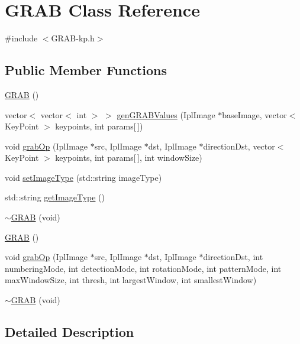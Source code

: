 \hypertarget{class_g_r_a_b}{\section{G\-R\-A\-B Class Reference}
\label{class_g_r_a_b}
}


{\ttfamily \#include $<$G\-R\-A\-B-\/kp.\-h$>$}

\subsection*{Public Member Functions}
\begin{DoxyCompactItemize}
\item 
\hyperlink{class_g_r_a_b_ae2bde4a3327818675a5ed65073f223fd}{G\-R\-A\-B} ()
\item 
vector$<$ vector$<$ int $>$ $>$ \hyperlink{class_g_r_a_b_a9cd1730b29bcd10fa4dbf3dbf8f3814f}{gen\-G\-R\-A\-B\-Values} (Ipl\-Image $\ast$base\-Image, vector$<$ Key\-Point $>$ keypoints, int params\mbox{[}$\,$\mbox{]})
\item 
void \hyperlink{class_g_r_a_b_a740a63e26e514f70818d6f89219a0360}{grab\-Op} (Ipl\-Image $\ast$src, Ipl\-Image $\ast$dst, Ipl\-Image $\ast$direction\-Dst, vector$<$ Key\-Point $>$ keypoints, int params\mbox{[}$\,$\mbox{]}, int window\-Size)
\item 
void \hyperlink{class_g_r_a_b_a51e922475b650e19f0ba6510eab1ca53}{set\-Image\-Type} (std\-::string image\-Type)
\item 
std\-::string \hyperlink{class_g_r_a_b_ab094c064ddeaafd4762b4e45ba70bdee}{get\-Image\-Type} ()
\item 
\hyperlink{class_g_r_a_b_aebd3007553d608e5f2bf37bc8fce4c72}{$\sim$\-G\-R\-A\-B} (void)
\item 
\hyperlink{class_g_r_a_b_ae2bde4a3327818675a5ed65073f223fd}{G\-R\-A\-B} ()
\item 
void \hyperlink{class_g_r_a_b_a3653340c6870bf3c7157d504826fe2db}{grab\-Op} (Ipl\-Image $\ast$src, Ipl\-Image $\ast$dst, Ipl\-Image $\ast$direction\-Dst, int numbering\-Mode, int detection\-Mode, int rotation\-Mode, int pattern\-Mode, int max\-Window\-Size, int thresh, int largest\-Window, int smallest\-Window)
\item 
\hyperlink{class_g_r_a_b_aebd3007553d608e5f2bf37bc8fce4c72}{$\sim$\-G\-R\-A\-B} (void)
\end{DoxyCompactItemize}


\subsection{Detailed Description}


